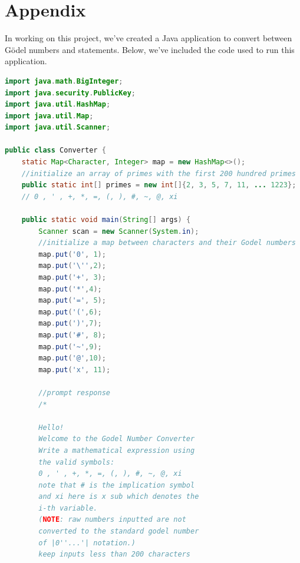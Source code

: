 \documentclass[conference]{IEEEtran}
\begin{document}
\section*{Appendix}
In working on this project, we've created a Java application to convert between Gödel numbers and statements. Below, we've included the code used to run this application. 
\begin{lstlisting}[language=Java]
import java.math.BigInteger;
import java.security.PublicKey;
import java.util.HashMap;
import java.util.Map;
import java.util.Scanner;

public class Converter {
    static Map<Character, Integer> map = new HashMap<>();
    //initialize an array of primes with the first 200 hundred primes 
    public static int[] primes = new int[]{2, 3, 5, 7, 11, ... 1223};
    // 0 , ' , +, *, =, (, ), #, ~, @, xi

    public static void main(String[] args) {
        Scanner scan = new Scanner(System.in);
        //initialize a map between characters and their Godel numbers
        map.put('0', 1);
        map.put('\'',2);
        map.put('+', 3);
        map.put('*',4);
        map.put('=', 5);
        map.put('(',6);
        map.put(')',7);
        map.put('#', 8);
        map.put('~',9);
        map.put('@',10);
        map.put('x', 11);

        //prompt response
        /*
        
        Hello!
        Welcome to the Godel Number Converter
        Write a mathematical expression using
        the valid symbols:
        0 , ' , +, *, =, (, ), #, ~, @, xi
        note that # is the implication symbol
        and xi here is x sub which denotes the
        i-th variable.
        (NOTE: raw numbers inputted are not
        converted to the standard godel number
        of |0''...'| notation.)
        keep inputs less than 200 characters
        

\end{lstlisting}
\end{document}
